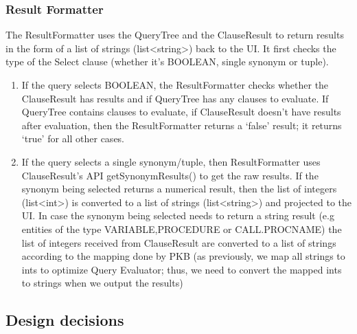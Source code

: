 \documentclass[12pt]{article}
\begin{document}
{{{{{{{{{{{{{\subsubsection{Result Formatter}
The ResultFormatter uses the QueryTree and the ClauseResult to return results in the form of a list of strings (list<string>)  back to the UI. It first checks the type of the Select clause (whether it’s BOOLEAN, single synonym or tuple). 
\begin{enumerate}
\item If the query selects BOOLEAN, the ResultFormatter checks whether the ClauseResult has results and if QueryTree has any clauses to evaluate. If QueryTree contains clauses to evaluate, if ClauseResult doesn’t have results after evaluation, then the ResultFormatter returns a ‘false’ result; it returns ‘true’ for all other cases.
\item If the query selects a single synonym/tuple, then ResultFormatter uses ClauseResult’s API getSynonymResults() to get the raw results. If the synonym being selected returns a numerical result, then the list of integers (list<int>) is converted to a list of strings (list<string>) and projected to the UI. 
In case the synonym being selected needs to return a string result (e.g entities of the type VARIABLE,PROCEDURE or CALL.PROCNAME) the list of integers received from ClauseResult are converted to a list of strings according to the mapping done by PKB (as previously, we map all strings to ints to optimize Query Evaluator; thus, we need to convert the mapped ints to strings when we output the results)
\end{enumerate}
\subsection{Design decisions}
}}}}}}}}}}}}}
\end{document}
